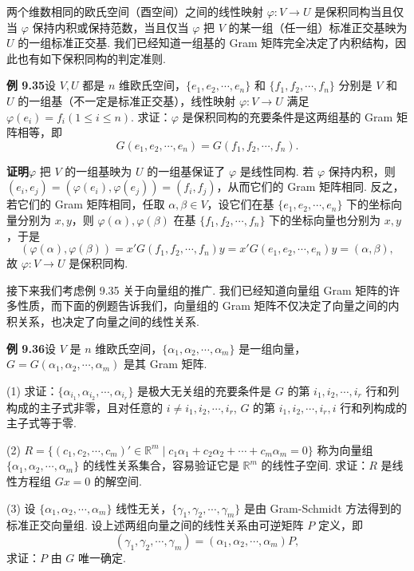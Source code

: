 \documentclass[UTF8, 12pt, fontset=fandol, oneside]{ctexart}
\begin{document}
两个维数相同的欧氏空间（酉空间）之间的线性映射 $\varphi:V\to U$ 是保积同构当且仅当 $\varphi$ 保持内积或保持范数，当且仅当 $\varphi$ 把 $V$ 的某一组（任一组）标准正交基映为 $U$ 的一组标准正交基. 我们已经知道一组基的 Gram 矩阵完全决定了内积结构，因此也有如下保积同构的判定准则.

\noindent\textbf{例 9.35}\quad 设 $V,U$ 都是 $n$ 维欧氏空间，$\{e_1,e_2,\cdots,e_n\}$ 和 $\{f_1,f_2,\cdots,f_n\}$ 分别是 $V$ 和 $U$ 的一组基（不一定是标准正交基），线性映射 $\varphi:V\to U$ 满足 $\varphi(e_i)=f_i(1\le i\le n)$. 求证：$\varphi$ 是保积同构的充要条件是这两组基的 Gram 矩阵相等，即
\[
G(e_1,e_2,\cdots,e_n)=G(f_1,f_2,\cdots,f_n).
\]

\noindent\textbf{证明}\quad $\varphi$ 把 $V$ 的一组基映为 $U$ 的一组基保证了 $\varphi$ 是线性同构. 若 $\varphi$ 保持内积，则 $(e_i,e_j)=(\varphi(e_i),\varphi(e_j))=(f_i,f_j)$，从而它们的 Gram 矩阵相同. 反之，若它们的 Gram 矩阵相同，任取 $\alpha,\beta\in V$，设它们在基 $\{e_1,e_2,\cdots,e_n\}$ 下的坐标向量分别为 $x,y$，则 $\varphi(\alpha),\varphi(\beta)$ 在基 $\{f_1,f_2,\cdots,f_n\}$ 下的坐标向量也分别为 $x,y$，于是
\[
(\varphi(\alpha),\varphi(\beta))=x'G(f_1,f_2,\cdots,f_n)y=x'G(e_1,e_2,\cdots,e_n)y=(\alpha,\beta),
\]
故 $\varphi:V\to U$ 是保积同构.

接下来我们考虑例 9.35 关于向量组的推广. 我们已经知道向量组 Gram 矩阵的许多性质，而下面的例题告诉我们，向量组的 Gram 矩阵不仅决定了向量之间的内积关系，也决定了向量之间的线性关系.

\noindent\textbf{例 9.36}\quad 设 $V$ 是 $n$ 维欧氏空间，$\{\alpha_1,\alpha_2,\cdots,\alpha_m\}$ 是一组向量，$G=G(\alpha_1,\alpha_2,\cdots,\alpha_m)$ 是其 Gram 矩阵.

(1) 求证：$\{\alpha_{i_1},\alpha_{i_2},\cdots,\alpha_{i_r}\}$ 是极大无关组的充要条件是 $G$ 的第 $i_1,i_2,\cdots,i_r$ 行和列构成的主子式非零，且对任意的 $i\ne i_1,i_2,\cdots,i_r$, $G$ 的第 $i_1,i_2,\cdots,i_r,i$ 行和列构成的主子式等于零.

(2) $R=\{(c_1,c_2,\cdots,c_m)'\in\mathbb{R}^m\mid c_1\alpha_1+c_2\alpha_2+\cdots+c_m\alpha_m=0\}$ 称为向量组 $\{\alpha_1,\alpha_2,\cdots,\alpha_m\}$ 的线性关系集合，容易验证它是 $\mathbb{R}^m$ 的线性子空间. 求证：$R$ 是线性方程组 $Gx=0$ 的解空间.

(3) 设 $\{\alpha_1,\alpha_2,\cdots,\alpha_m\}$ 线性无关，$\{\gamma_1,\gamma_2,\cdots,\gamma_m\}$ 是由 Gram-Schmidt 方法得到的标准正交向量组. 设上述两组向量之间的线性关系由可逆矩阵 $P$ 定义，即
\[
(\gamma_1,\gamma_2,\cdots,\gamma_m)=(\alpha_1,\alpha_2,\cdots,\alpha_m)P,
\]
求证：$P$ 由 $G$ 唯一确定.
\end{document}
